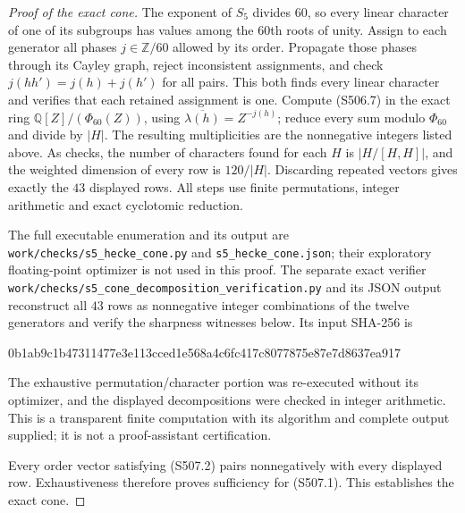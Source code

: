 \begin{proof}[Proof of the exact cone]
The exponent of $S_5$ divides $60$, so every linear character of
one of its subgroups has values among the $60$th roots of unity.
Assign to each generator all phases $j\in\mathbb Z/60$ allowed
by its order.  Propagate those phases through its Cayley graph,
reject inconsistent assignments, and check
$j(hh')=j(h)+j(h')$ for all pairs.  This both finds every linear
character and verifies that each retained assignment is one.
Compute (S506.7) in the exact ring
$\mathbb Q[Z]/(\Phi_{60}(Z))$, using
$\overline{\lambda(h)}=Z^{-j(h)}$; reduce every sum modulo
$\Phi_{60}$ and divide by $|H|$.  The resulting multiplicities
are the nonnegative integers listed above.  As checks, the number
of characters found for each $H$ is $|H/[H,H]|$, and the
weighted dimension of every row is $120/|H|$.
Discarding repeated vectors gives exactly the $43$ displayed rows.
All steps use finite permutations, integer arithmetic and exact
cyclotomic reduction.

The full executable enumeration and its output are
\texttt{work/checks/s5\_hecke\_cone.py} and
\texttt{s5\_hecke\_cone.json}; their exploratory floating-point
optimizer is not used in this proof.  The separate exact verifier
\texttt{work/checks/s5\_cone\_decomposition\_verification.py}
and its JSON output reconstruct all $43$ rows as nonnegative
integer combinations of the twelve generators and verify the
sharpness witnesses below.  Its input SHA-256 is
\begin{center}\small\ttfamily
0b1ab9c1b47311477e3e113cced1e568a4c6fc417c8077875e87e7d8637ea917
\end{center}
The exhaustive permutation/character portion was re-executed
without its optimizer, and the displayed decompositions were
checked in integer arithmetic.  This is a transparent finite
computation with its algorithm and complete output supplied;
it is not a proof-assistant certification.

Every order vector satisfying (S507.2) pairs nonnegatively
with every displayed row.  Exhaustiveness therefore proves
sufficiency for (S507.1).  This establishes the exact cone.
\end{proof}

